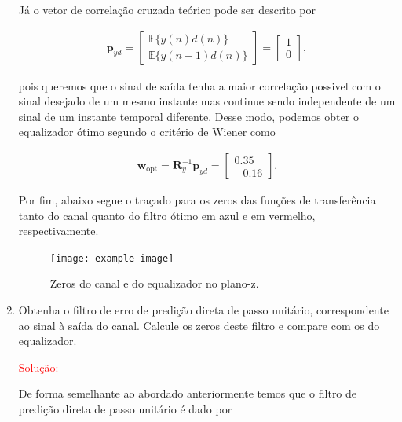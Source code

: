 \begin{enumerate}
        Já o vetor de correlação cruzada teórico pode ser descrito por
        
        \begin{align}
            \mathbf{p}_{yd} =
            \begin{bmatrix}
                \mathbb{E}\{y(n)d(n)\} \\
                \mathbb{E}\{y(n - 1)d(n)\}
            \end{bmatrix} = 
            \begin{bmatrix}
                1 \\
                0
            \end{bmatrix},
        \end{align}
        
        pois queremos que o sinal de saída tenha a maior correlação possivel com o sinal desejado de um mesmo instante mas continue sendo independente de um sinal de um instante temporal diferente.
        Desse modo, podemos obter o equalizador ótimo segundo o critério de Wiener como
        
        \begin{align}
            \mathbf{w}_{\text{opt}} = \mathbf{R}^{-1}_{y} \mathbf{p}_{yd} = \begin{bmatrix}
                0.35 \\
                -0.16
            \end{bmatrix}.
        \end{align}
        
        Por fim, abaixo segue o traçado para os zeros das funções de transferência tanto do canal quanto do filtro ótimo em azul e em vermelho, respectivamente.
        
        \begin{figure}[!htp]
            \centering
            \texttt{[image: example-image]}
            \caption{Zeros do canal e do equalizador no plano-z.}
        \end{figure}
    
    \item Obtenha o ﬁltro de erro de predição direta de passo unitário, correspondente ao sinal à saída do canal. Calcule os zeros deste ﬁltro e compare com os do equalizador.
    
        \textcolor{red}{Solução:}

        De forma semelhante ao abordado anteriormente temos que o filtro de predição direta de passo unitário é dado por
        

\end{enumerate}
